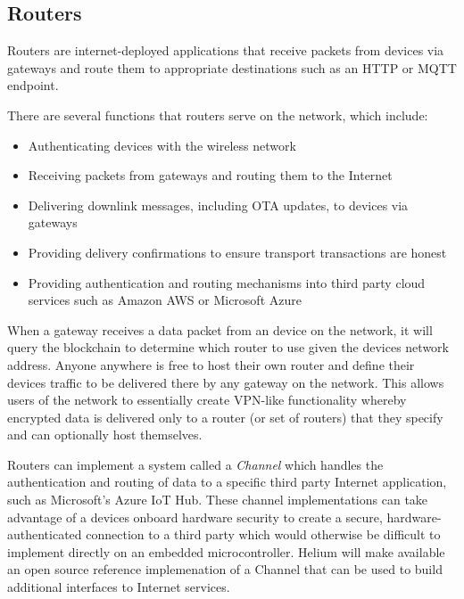 \documentclass[letterpaper,11pt]{article}
\begin{document}
\subsection{Routers}

Routers are internet-deployed applications that receive packets from devices via gateways and route them to appropriate destinations such as an HTTP or MQTT endpoint.\newline

There are several functions that routers serve on the network, which include:

\begin{itemize}
	\item Authenticating devices with the wireless network
	\item Receiving packets from gateways and routing them to the Internet
	\item Delivering downlink messages, including OTA updates, to devices via gateways
	\item Providing delivery confirmations to ensure transport transactions are honest
	\item Providing authentication and routing mechanisms into third party cloud services such as Amazon AWS or Microsoft Azure
\end{itemize}

When a gateway receives a data packet from an device on the network, it will query the blockchain to determine which router to use given the devices network address. Anyone anywhere is free to host their own router and define their devices traffic to be delivered there by any gateway on the network. This allows users of the network to essentially create VPN-like functionality whereby encrypted data is delivered only to a router (or set of routers) that they specify and can optionally host themselves.\newline

Routers can implement a system called a \textit{Channel} which handles the authentication and routing of data to a specific third party Internet application, such as Microsoft's Azure IoT Hub\cite{azure}. These channel implementations can take advantage of a devices onboard hardware security to create a secure, hardware-authenticated connection to a third party which would otherwise be difficult to implement directly on an embedded microcontroller. Helium will make available an open source reference implemenation of a Channel that can be used to build additional interfaces to Internet services.\newline
\end{document}

